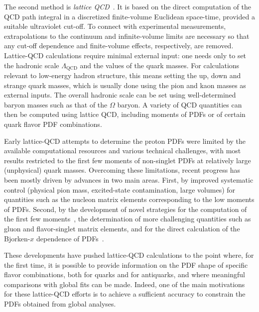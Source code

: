 The second method is {\it lattice QCD}~\cite{Olive:2016xmw,Gupta:1997nd}.
%
It is based on the direct computation of the QCD path integral in a 
discretized finite-volume Euclidean space-time, provided a suitable ultraviolet
cut-off.
%
To connect with experimental measurements, extrapolations to the 
continuum and infinite-volume limits are necessary so that any  
cut-off dependence and finite-volume effects, respectively, are removed.
%
Lattice-QCD calculations require minimal external input: one needs only to 
set the hadronic scale $\Lambda_\text{QCD}$ and the values of the quark masses.
%
For calculations relevant to low-energy hadron structure, this means
setting the up, down and strange quark masses,
which is usually done using the pion and kaon masses as external inputs.
%
The overall hadronic scale can be set using well-determined baryon masses 
such as that of the $\Omega$ baryon.
%
A variety of QCD quantities can then be computed using lattice QCD, including
moments of PDFs or of certain quark flavor PDF combinations.

Early lattice-QCD attempts to determine the proton PDFs were limited by the 
available computational resources and various technical challenges, with most 
results restricted to the first few moments of non-singlet PDFs at relatively 
large (unphysical) quark masses.
%
Overcoming these limitations, recent progress has been mostly
driven by advances in two main areas. 
%
First, by improved systematic control (physical pion mass, excited-state 
contamination, large volumes) for quantities such as the nucleon matrix 
elements corresponding to the low moments of PDFs.
%
Second, by the  development of novel strategies
for the computation of the first few 
moments~\cite{Constantinou:2014tga,Syritsyn:2014saa,Lin:2012ev},
the determination of more challenging quantities 
such as gluon and flavor-singlet matrix elements, and
for the direct calculation of the 
Bjorken-$x$ dependence of PDFs~\cite{Lin:2014zya,Alexandrou:2015rja,
Chen:2016utp,Alexandrou:2016jqi}.

These developments have pushed lattice-QCD calculations to the point where, 
for the first time, it is possible to provide information on the PDF shape
of specific flavor combinations, both for quarks and for antiquarks, 
and where meaningful comparisons with global fits can be made.
%
Indeed, one of the main motivations for these lattice-QCD efforts is to 
achieve a sufficient accuracy to constrain the PDFs obtained from global 
analyses.

